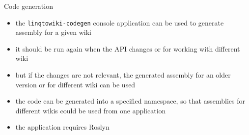 \documentclass{beamer}
\begin{document}
\begin{frame}{Code generation}
\begin{itemize}
\item the \texttt{linqtowiki-codegen} console application can be used to generate assembly for a given wiki
\item it should be run again when the API changes or for working with different wiki
\item but if the changes are not relevant, the generated assembly for an older version or for different wiki can be used
\item the code can be generated into a specified namespace, so that assemblies for different wikis could be used from one application
\item the application requires Roslyn
\end{itemize}
\end{frame}
\end{document}
